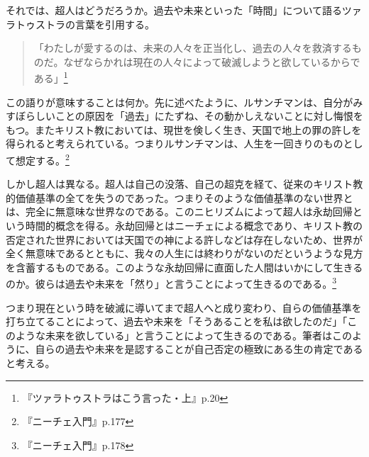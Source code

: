 \documentclass[b5j,twoside,twocolumn]{utarticle}
\begin{document}
それでは、超人はどうだろうか。過去や未来といった「時間」について語るツァラトゥストラの言葉を引用する。
\begin{quote}
「わたしが愛するのは、未来の人々を正当化し、過去の人々を救済するものだ。なぜならかれは現在の人々によって破滅しようと欲しているからである」\footnote{『ツァラトゥストラはこう言った・上』p.20}
\end{quote}


この語りが意味することは何か。先に述べたように、ルサンチマンは、自分がみすぼらしいことの原因を「過去」にたずね、その動かしえないことに対し悔恨をもつ。またキリスト教においては、現世を倹しく生き、天国で地上の罪の許しを得られると考えられている。つまりルサンチマンは、人生を一回きりのものとして想定する。\footnote{『ニーチェ入門』p.177}


しかし超人は異なる。超人は自己の没落、自己の超克を経て、従来のキリスト教的価値基準の全てを失うのであった。つまりそのような価値基準のない世界とは、完全に無意味な世界なのである。このニヒリズムによって超人は永劫回帰という時間的概念を得る。永劫回帰とはニーチェによる概念であり、キリスト教の否定された世界においては天国での神による許しなどは存在しないため、世界が全く無意味であるとともに、我々の人生には終わりがないのだというような見方を含蓄するものである。このような永劫回帰に直面した人間はいかにして生きるのか。彼らは過去や未来を「然り」と言うことによって生きるのである。\footnote{『ニーチェ入門』p.178}


つまり現在という時を破滅に導いてまで超人へと成り変わり、自らの価値基準を打ち立てることによって、過去や未来を「そうあることを私は欲したのだ」「このような未来を欲している」と言うことによって生きるのである。筆者はこのように、自らの過去や未来を是認することが自己否定の極致にある生の肯定であると考える。
\end{document}
